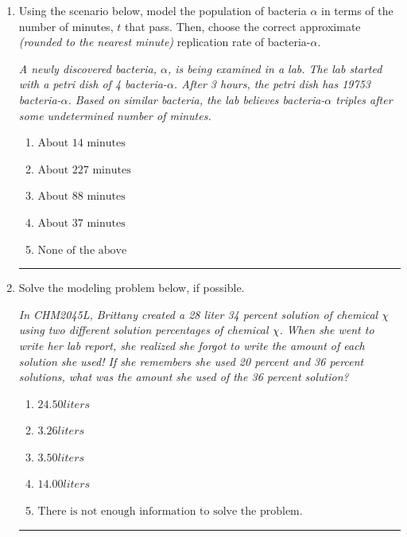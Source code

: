 \documentclass[14pt]{extbook}
\newcommand{\litem}[1]{\item#1\hspace*{-1cm}\rule{\textwidth}{0.4pt}}
\begin{document}
\begin{enumerate}
{\begin{enumerate}[label=\Alph*.]
\end{enumerate} }
\litem{
Using the scenario below, model the population of bacteria $\alpha$ in terms of the number of minutes, $t$ that pass. Then, choose the correct approximate \textit{(rounded to the nearest minute)} replication rate of bacteria-$\alpha$.
\begin{center}
    \textit{ A newly discovered bacteria, $\alpha$, is being examined in a lab. The lab started with a petri dish of 4 bacteria-$\alpha$. After 3 hours, the petri dish has 19753 bacteria-$\alpha$. Based on similar bacteria, the lab believes bacteria-$\alpha$ triples after some undetermined number of minutes. }
\end{center}
\begin{enumerate}[label=\Alph*.]
\item \( \text{About } 14 \text{ minutes} \)
\item \( \text{About } 227 \text{ minutes} \)
\item \( \text{About } 88 \text{ minutes} \)
\item \( \text{About } 37 \text{ minutes} \)
\item \( \text{None of the above} \)

\end{enumerate} }
\litem{
Solve the modeling problem below, if possible.
\begin{center}
    \textit{ In CHM2045L, Brittany created a 28 liter 34 percent solution of chemical $\chi$ using two different solution percentages of chemical $\chi$. When she went to write her lab report, she realized she forgot to write the amount of each solution she used! If she remembers she used 20 percent and 36 percent solutions, what was the amount she used of the 36 percent solution? }
\end{center}
\begin{enumerate}[label=\Alph*.]
\item \( 24.50 liters \)
\item \( 3.26 liters \)
\item \( 3.50 liters \)
\item \( 14.00 liters \)
\item \( \text{There is not enough information to solve the problem.} \)


\end{enumerate}}
\end{enumerate}
\end{document}
